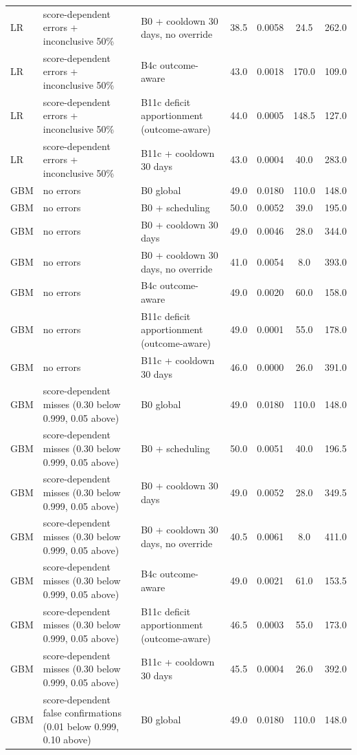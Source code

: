 \documentclass[10pt,onecolumn,letterpaper]{article}
\begin{document}
\begin{longtable}{lp{5.2cm}p{4.4cm}cccc}
LR & score-dependent errors + inconclusive 50\% & B0 + cooldown 30 days, no override & 38.5 & 0.0058 & 24.5 & 262.0 \\
LR & score-dependent errors + inconclusive 50\% & B4c outcome-aware & 43.0 & 0.0018 & 170.0 & 109.0 \\
LR & score-dependent errors + inconclusive 50\% & B11c deficit apportionment (outcome-aware) & 44.0 & 0.0005 & 148.5 & 127.0 \\
LR & score-dependent errors + inconclusive 50\% & B11c + cooldown 30 days & 43.0 & 0.0004 & 40.0 & 283.0 \\
GBM & no errors & B0 global & 49.0 & 0.0180 & 110.0 & 148.0 \\
GBM & no errors & B0 + scheduling & 50.0 & 0.0052 & 39.0 & 195.0 \\
GBM & no errors & B0 + cooldown 30 days & 49.0 & 0.0046 & 28.0 & 344.0 \\
GBM & no errors & B0 + cooldown 30 days, no override & 41.0 & 0.0054 & 8.0 & 393.0 \\
GBM & no errors & B4c outcome-aware & 49.0 & 0.0020 & 60.0 & 158.0 \\
GBM & no errors & B11c deficit apportionment (outcome-aware) & 49.0 & 0.0001 & 55.0 & 178.0 \\
GBM & no errors & B11c + cooldown 30 days & 46.0 & 0.0000 & 26.0 & 391.0 \\
GBM & score-dependent misses (0.30 below 0.999, 0.05 above) & B0 global & 49.0 & 0.0180 & 110.0 & 148.0 \\
GBM & score-dependent misses (0.30 below 0.999, 0.05 above) & B0 + scheduling & 50.0 & 0.0051 & 40.0 & 196.5 \\
GBM & score-dependent misses (0.30 below 0.999, 0.05 above) & B0 + cooldown 30 days & 49.0 & 0.0052 & 28.0 & 349.5 \\
GBM & score-dependent misses (0.30 below 0.999, 0.05 above) & B0 + cooldown 30 days, no override & 40.5 & 0.0061 & 8.0 & 411.0 \\
GBM & score-dependent misses (0.30 below 0.999, 0.05 above) & B4c outcome-aware & 49.0 & 0.0021 & 61.0 & 153.5 \\
GBM & score-dependent misses (0.30 below 0.999, 0.05 above) & B11c deficit apportionment (outcome-aware) & 46.5 & 0.0003 & 55.0 & 173.0 \\
GBM & score-dependent misses (0.30 below 0.999, 0.05 above) & B11c + cooldown 30 days & 45.5 & 0.0004 & 26.0 & 392.0 \\
GBM & score-dependent false confirmations (0.01 below 0.999, 0.10 above) & B0 global & 49.0 & 0.0180 & 110.0 & 148.0 \\

\end{longtable}
\end{document}
